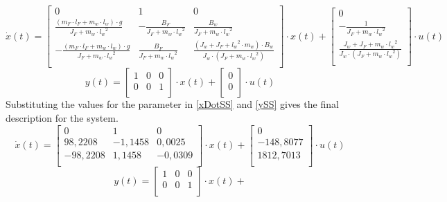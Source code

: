 \begin{equation}  \label{xDotSS}
	\dot{x}(t) = 
	\begin{bmatrix}
		0 & 1 & 0 \\
		\frac{(m_F \cdot l_F + m_w \cdot l_w) \cdot g}{J_F + m_w \cdot {l_w}^2} & -\frac{B_F}{J_F + m_w \cdot {l_w}^2} & \frac{B_w}{J_F + m_w \cdot {l_w}^2} \\
		- \frac{(m_F \cdot l_F + m_w \cdot l_w) \cdot g}{J_F+m_w \cdot {l_w}^{2}} & \frac{B_F}{J_F+m_w \cdot {l_w}^{2}} & \frac{(J_w+J_F+{l_w}^{2} \cdot m_w) \cdot B_w}{J_w \cdot (J_F+m_w \cdot  {l_w}^2)} \\
	\end{bmatrix}
	\cdot x(t) +
	\begin{bmatrix}
		0 \\
		- \frac{1}{J_F + m_w \cdot {l_w}^2} \\
		\frac{J_w+J_F+m_w \cdot {l_w}^{2}}{J_w \cdot (J_F+m_w \cdot {l_w}^{2})} \\
	\end{bmatrix}
	\cdot u(t)
\end{equation}
\begin{equation} \label{ySS}
	y(t) = 
	\begin{bmatrix}
		1 & 0 & 0 \\
		0 & 0 & 1 \\
	\end{bmatrix}
	\cdot x(t) +
	\begin{bmatrix}
		0 \\
		0 \\
	\end{bmatrix}
\cdot u(t)
\end{equation}
%
Substituting the values for the parameter in \eqref{xDotSS} and \eqref{ySS} gives the final description for the system.
%
\begin{equation}  \label{xDotSS}
	\dot{x}(t) = 
	\begin{bmatrix}
		0 & 1 & 0 \\
		98,2208 & -1,1458 & 0,0025 \\
		-98,2208 & 1,1458 & -0,0309 \\
	\end{bmatrix}
	\cdot x(t) +
	\begin{bmatrix}
		0 \\
		- 148,8077 \\
		1812,7013 \\
	\end{bmatrix}
	\cdot u(t)
\end{equation}
\begin{equation} \label{ySS}
	y(t) = 
	\begin{bmatrix}
		1 & 0 & 0 \\
		0 & 0 & 1 \\
	\end{bmatrix}
	\cdot x(t) +
\end{equation}

